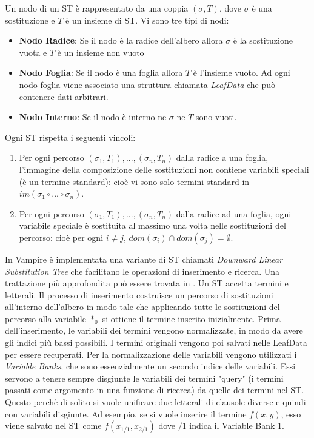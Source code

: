 \documentclass[./main.tex]{subfiles}
\begin{document}
Un nodo di un ST è rappresentato da una coppia $(\sigma, T)$, dove $\sigma$ è una sostituzione e $T$ è un insieme di ST.
Vi sono tre tipi di nodi:

\begin{itemize}
    \item \textbf{Nodo Radice}: Se il nodo è la radice dell'albero allora $\sigma$ è la sostituzione vuota e $T$ è un insieme non vuoto
    \item \textbf{Nodo Foglia}: Se il nodo è una foglia allora $T$ è l'insieme vuoto. Ad ogni nodo foglia 
    viene associato una struttura chiamata \textit{LeafData} che può contenere dati arbitrari.
    \item \textbf{Nodo Interno}: Se il nodo è interno ne $\sigma$ ne $T$ sono vuoti.
\end{itemize}


Ogni ST rispetta i seguenti vincoli:

\begin{enumerate}
    \item Per ogni percorso $(\sigma_1, T_1), ... , (\sigma_n, T_n)$
     dalla radice a una foglia, l'immagine della composizione delle sostituzioni non contiene variabili speciali (è un termine standard):
     cioè vi sono solo termini standard in $im(\sigma_1 \circ ... \circ \sigma_n)$.
    \item Per ogni percorso $(\sigma_1, T_1), ... , (\sigma_n, T_n)$
    dalla radice ad una foglia, ogni variabile speciale è sostituita al massimo una volta nelle sostituzioni del percorso:
    cioè per ogni $i \neq j$, $dom(\sigma_i) \cap dom(\sigma_j) = \emptyset$.
\end{enumerate}

In Vampire è implementata una variante di ST chiamati \textit{Downward Linear Substitution Tree} che facilitano
le operazioni di inserimento e ricerca. Una trattazione più approfondita può essere trovata in \cite{vampireUnification}.
Un ST accetta termini e letterali. Il processo di inserimento costruisce un percorso di sostituzioni all'interno dell'albero
in modo tale che applicando tutte le sostituzioni del percorso alla variabile $*_0$ si ottiene il termine inserito inizialmente.
Prima dell'inserimento, le variabili dei termini vengono normalizzate,
in modo da avere gli indici più bassi possibili. I termini originali vengono poi salvati nelle LeafData per essere recuperati.
Per la normalizzazione delle variabili vengono utilizzati i \textit{Variable Banks}, che sono essenzialmente un secondo indice delle variabili.
Essi servono a tenere sempre disgiunte le variabili dei termini "query" (i termini passati come argomento in una funzione di ricerca)
da quelle dei termini nel ST. 
Questo perchè di solito si vuole unificare due letterali di clausole diverse e quindi con variabili disgiunte.
Ad esempio, se si vuole inserire il termine $f(x, y)$, esso viene salvato nel ST come
$f(x_{1/1}, x_{2/1})$ dove $/1$ indica il Variable Bank 1.
\end{document}
